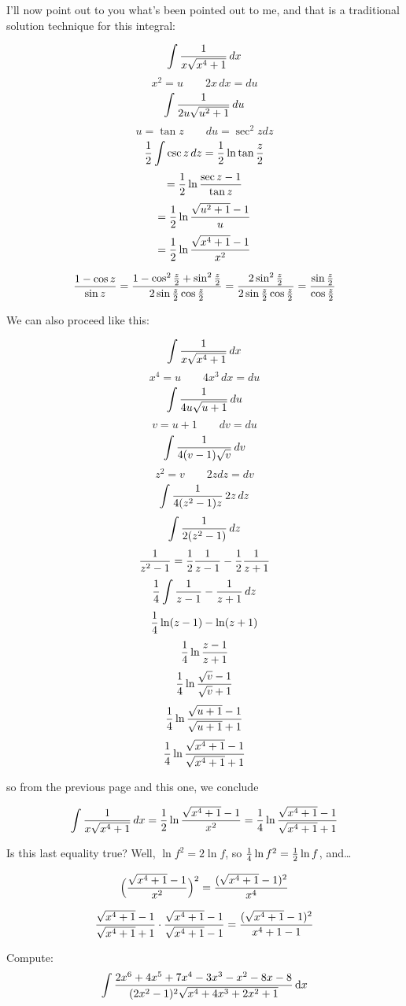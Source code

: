 I'll now point out to you what's been pointed out to me, and that is a
traditional solution technique for this integral:

$$\int {1\over{x\sqrt{x^4+1}}} \, dx$$
$$x^2 = u \qquad 2 x\, dx = du$$
$$\int {1\over{2u\sqrt{u^2+1}}} \, du$$
$$u = \tan z \qquad du = \sec^2 z dz$$
$${1 \over 2} \int \csc z \, dz = {1\over 2} \ln \tan {z\over2}$$
$$={1\over2} \ln {{\sec z - 1}\over{\tan z}}$$
$$={1\over2} \ln {{\sqrt{u^2+1}-1}\over{u}}$$
$$={1\over2} \ln {{\sqrt{x^4+1}-1}\over{x^2}}$$

\vskip 0.5in

$${{1 - \cos z}\over{\sin z}} = {{1 - \cos^2 {z\over2} + \sin^2 {z\over2}}\over{2\sin{z\over2}\cos{z\over2}}} = {{2\sin^2 {z\over2}}\over{2\sin{z\over2}\cos{z\over2}}} = {{\sin {z\over2}}\over{\cos{z\over2}}} $$

\vfill\eject

We can also proceed like this:

$$\int {1\over{x\sqrt{x^4+1}}} \, dx$$
$$x^4 = u \qquad 4 x^3\, dx = du$$
$$\int {1\over{4u\sqrt{u+1}}} \, du$$
$$v = u + 1 \qquad dv = du$$
$$\int {1\over{4(v-1)\sqrt{v}}} \, dv$$
$$z^2 = v \qquad 2 z dz = dv$$
$$\int {1\over{4(z^2-1)z}} \, 2z\, dz$$
$$\int {1\over{2(z^2-1)}} \, dz$$
$${1\over{z^2-1}} = {1\over2}{1\over{z-1}} - {1\over2}{1\over{z+1}}$$
$${1\over4} \int {1\over{z-1}} - {1\over{z+1}} \, dz$$
$${1\over4} \ln (z-1) - \ln (z+1)$$
$${1\over4} \ln {{z-1}\over{z+1}}$$
$${1\over4} \ln {{\sqrt{v}-1}\over{\sqrt{v}+1}}$$
$${1\over4} \ln {{\sqrt{u+1}-1}\over{\sqrt{u+1}+1}}$$
$${1\over4} \ln {{\sqrt{x^4+1}-1}\over{\sqrt{x^4+1}+1}}$$

so from the previous page and this one, we conclude

$$\int {1\over{x\sqrt{x^4+1}}} \, dx
={1\over2} \ln {{\sqrt{x^4+1}-1}\over{x^2}}
={1\over4} \ln {{\sqrt{x^4+1}-1}\over{\sqrt{x^4+1}+1}}$$

Is this last equality true?  Well, $\ln f^2 = 2\ln f$, so
${1\over4}\ln f^2 = {1\over2}\ln f$, and\ldots

$$\Big({{\sqrt{x^4+1}-1}\over{x^2}}\Big)^2
= {{(\sqrt{x^4+1}-1)^2}\over{x^4}}$$

$${{\sqrt{x^4+1}-1}\over{\sqrt{x^4+1}+1}} \cdot
{{\sqrt{x^4+1}-1}\over{\sqrt{x^4+1}-1}}
= {{(\sqrt{x^4+1}-1)^2}\over{x^4+1-1}}$$




\endexample

\vfill\eject
{}

\example Compute:
$$\int {{2x^6+4x^5+7x^4-3x^3-x^2-8x-8}\over{(2x^2-1)^2\sqrt{x^4+4 x^3+2 x^2+1}}} \,{\rm d}x$$

